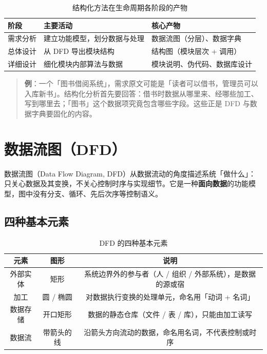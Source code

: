 \begin{table}[H]
\centering
\caption{结构化方法在生命周期各阶段的产物}
\begin{tabulary}{\textwidth}{LLL}
\toprule
阶段 & 主要活动 & 核心产物 \\
\midrule
需求分析 & 建立功能模型，划分数据与处理 & 数据流图（分层）、数据字典 \\
总体设计 & 从 DFD 导出模块结构 & 结构图（模块层次 + 调用） \\
详细设计 & 细化模块内部算法与数据 & 模块说明、伪代码、数据库设计 \\
\bottomrule
\end{tabulary}
\end{table}

\begin{quote}
\textbf{例}：一个「图书借阅系统」，需求原文可能是「读者可以借书，管理员可以入库新书」。结构化分析首先要回答：借书时数据从哪里来、经哪些加工、写到哪里去；「图书」这个数据项究竟包含哪些字段。这些正是 DFD 与数据字典要固化的内容。
\end{quote}

\section{数据流图（DFD）}

数据流图（Data Flow Diagram, DFD）从数据流动的角度描述系统「做什么」：只关心数据及其变换，不关心控制时序与实现细节。它是一种\textbf{面向数据}的功能模型，图中没有分支、循环、先后次序等控制语义。

\subsection{四种基本元素}

\begin{table}[H]
\centering
\caption{DFD 的四种基本元素}
\begin{tabulary}{\textwidth}{CCC}
\toprule
元素 & 图形 & 说明 \\
\midrule
外部实体 & 矩形 & 系统边界外的参与者（人 / 组织 / 外部系统），是数据的源或宿 \\
加工 & 圆 / 椭圆 & 对数据执行变换的处理单元，命名用「动词 + 名词」 \\
数据存储 & 开口矩形 & 数据的静态仓库（文件 / 表 / 库），只能由加工读写 \\
数据流 & 带箭头的线 & 沿箭头方向流动的数据，命名用名词，不代表控制或时序 \\
\bottomrule
\end{tabulary}
\end{table}

